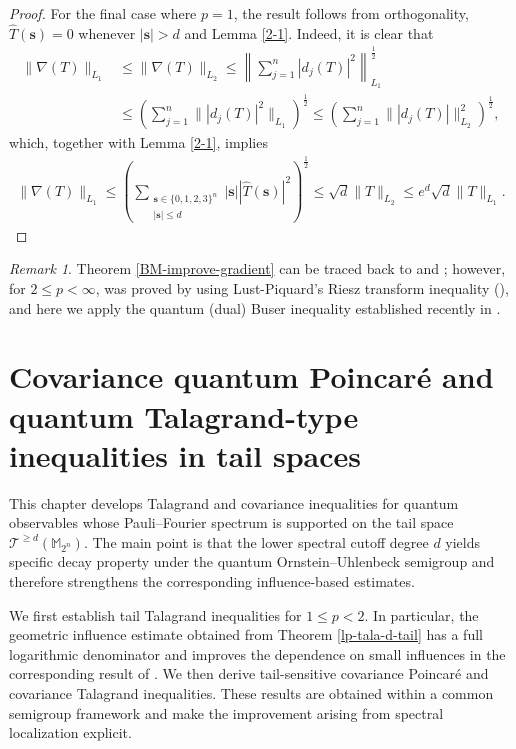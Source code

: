 \documentclass{amsbook}
\theoremstyle{definition}
\theoremstyle{remark}
\newtheorem{remark}[theorem]{Remark}
\numberwithin{section}{chapter}
\numberwithin{equation}{chapter}
\newcommand{\1}{\mathbf{1}}
\newcommand{\s}{\mathbf{s}}
\begin{document}
\begin{proof}
	For the final case where $p=1$, the result follows from orthogonality, $\widehat{T}(\s)=0$ whenever $|\s|>d$ and Lemma \ref{2-1}. Indeed, it is clear that
\begin{equation*}\label{gradient estimate 1}
\begin{split}
\|\nabla (T)\|_{L_{1}}&\leq \|\nabla (T)\|_{L_{2}}\leq\left\|\sum_{j=1}^n|d_j(T)|^2\right\|_{L_{1}}^{\frac{1}{2}}\\
&\leq \left(\sum_{j=1}^n\||d_j(T)|^2\|_{L_{1}}\right)^{\frac{1}{2}}\leq\left(\sum_{j=1}^n\||d_j(T)|\|_{L_{2}}^2\right)^{\frac{1}{2}},
\end{split}
\end{equation*}
which, together with Lemma \ref{2-1}, implies
\[
\begin{split}
\|\nabla (T)\|_{L_{1}}\leq \left(\sum_{\substack{\s\in\{0,1,2,3\}^n\\|\s|\leq d}}|\s||\widehat{T}(\s)|^2\right)^{\frac{1}{2}}\leq\sqrt{d}\|T\|_{L_{2}}\leq e^d\sqrt{d}\|T\|_{L_{1}}.
\end{split}
\]
\end{proof}
\begin{remark}\label{p12infty} Theorem \ref{BM-improve-gradient}  can be traced back to \cite[Theorem 15]{EI2020} and \cite[Proposition 46]{EI2020}; however, for $2\leq p<\infty$,  \cite[Theorem 15]{EI2020} was proved by using  Lust-Piquard's  Riesz transform inequality (\cite{BL2008,Lu1998}), and here we apply the quantum (dual) Buser inequality established recently in \cite{JLLZ2025}.
\end{remark}

\chapter[Covariance tail quantum inequalities]{Covariance quantum Poincar\'e and quantum Talagrand-type inequalities in tail spaces}\label{sec-tala-tail}

This chapter develops Talagrand and covariance inequalities for
quantum observables whose Pauli--Fourier spectrum is supported on the
tail space $\mathcal{T}^{\geq d}(\mathbb{M}_{2^n})$. The main point is that the lower spectral cutoff degree $d$ yields specific decay property under the quantum Ornstein--Uhlenbeck semigroup and therefore strengthens the corresponding influence-based estimates.

We first establish tail Talagrand inequalities for $1\leq p<2$.  In particular, the geometric
influence estimate obtained from Theorem \ref{lp-tala-d-tail} has a full logarithmic denominator and improves the dependence on small influences in the corresponding result of \cite{RWZ2024}.  We then derive tail-sensitive covariance Poincar\'e and covariance Talagrand
inequalities.  These results are obtained within a common semigroup framework and make the improvement arising from spectral localization explicit.
\end{document}
